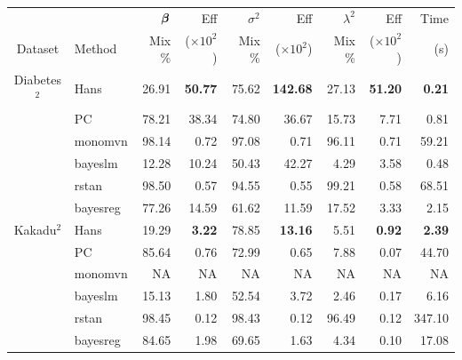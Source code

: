 \begin{table}[!ht]
    \centering
    \begin{tabular}{c|l|rr|rr|rr|r}
    \toprule
            &       &  ${\boldsymbol \beta}$  & Eff                & $\sigma^2$   & Eff                  & $\lambda^2$   & Eff                      & Time \\
    Dataset & Method & Mix \%  & ($\times 10^2$)     & Mix \%  & ($\times 10^2$)       & Mix \%  & ($\times 10^2$)           &  (s) \\
\midrule 
 

Diabetes$^2$ & Hans           &  26.91      &  \textbf{50.77}       & 75.62       &  \textbf{142.68}       & 27.13       & \textbf{51.20}      & \textbf{0.21}  \\
         & PC             &  78.21       & 38.34       & 74.80       & 36.67       & 15.73      &  7.71    & 0.81  \\
         & monomvn        &  98.14       &  0.72      & 97.08       &  0.71      & 96.11       & 0.71       &  59.21 \\
         & bayeslm        &  12.28       &  10.24       & 50.43       & 42.27       &    4.29     &  3.58      &  0.48 \\
         & rstan           &  98.50     &   0.57       & 94.55     &   0.55      & 99.21 &  0.58      & 68.51 \\ 
         & bayesreg       &  77.26      &   14.59     & 61.62       &   11.59      & 17.52       &  3.33       &  2.15 \\ 
\midrule 

Kakadu$^2$  & Hans           &  19.29     &  \textbf{3.22}      & 78.85   & \textbf{13.16}      &  5.51     & \textbf{0.92}     &  \textbf{2.39}\\
         & PC             & 85.64       & 0.76        & 72.99      & 0.65     & 7.88      & 0.07        &  44.70 \\
         & monomvn        & NA        &  NA        & NA       &  NA        & NA       &  NA       &  NA \\
         & bayeslm        &  15.13       &  1.80     &  52.54      &  3.72      &  2.46       &   0.17     &  6.16 \\
         & rstan           & 98.45        &  0.12      & 98.43    &  0.12      & 96.49    &  0.12      & 347.10 \\ 
         & bayesreg       & 84.65       &  1.98     & 69.65     &  1.63      & 4.34    &   0.10    &  17.08 \\ 


\end{tabular}
\end{table}
